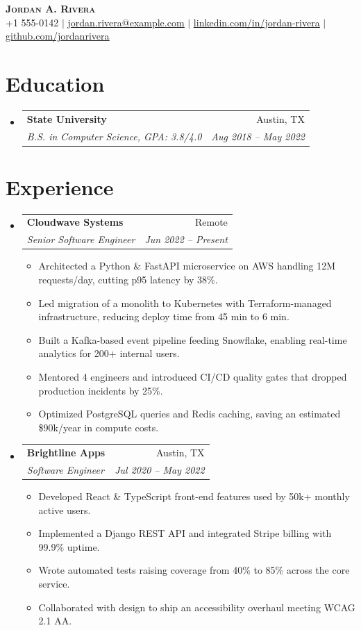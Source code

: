 \documentclass[letterpaper,11pt]{article}
\makeatletter
\newcommand{\resumeItem}[1]{
  \item\small{{#1 \vspace{-2pt}}}
}
\newcommand{\resumeSubheading}[4]{
  \vspace{-2pt}\item
    \begin{tabular*}{0.97\textwidth}[t]{l@{\extracolsep{\fill}}r}
      \textbf{#1} & #2 \\
      \textit{\small#3} & \textit{\small #4} \\
    \end{tabular*}\vspace{-7pt}
}
\newcommand{\resumeSubHeadingListStart}{\begin{itemize}[leftmargin=0.15in, label={}]}
\newcommand{\resumeSubHeadingListEnd}{\end{itemize}}
\newcommand{\resumeItemListStart}{\begin{itemize}}
\newcommand{\resumeItemListEnd}{\end{itemize}\vspace{-5pt}}
\makeatother
\begin{document}
\begin{center}
    \textbf{\Huge \scshape Jordan A. Rivera} \\ \vspace{1pt}
    \small +1 555-0142 $|$
    \href{mailto:jordan.rivera@example.com}{\underline{jordan.rivera@example.com}} $|$
    \href{https://linkedin.com/in/jordan-rivera}{\underline{linkedin.com/in/jordan-rivera}} $|$
    \href{https://github.com/jordanrivera}{\underline{github.com/jordanrivera}}
\end{center}

\section{Education}
  \resumeSubHeadingListStart
    \resumeSubheading
      {State University}{Austin, TX}
      {B.S. in Computer Science, GPA: 3.8/4.0}{Aug 2018 -- May 2022}
  \resumeSubHeadingListEnd

\section{Experience}
  \resumeSubHeadingListStart
    \resumeSubheading
      {Cloudwave Systems}{Remote}
      {Senior Software Engineer}{Jun 2022 -- Present}
      \resumeItemListStart
        \resumeItem{Architected a Python \& FastAPI microservice on AWS handling 12M requests/day, cutting p95 latency by 38\%.}
        \resumeItem{Led migration of a monolith to Kubernetes with Terraform-managed infrastructure, reducing deploy time from 45 min to 6 min.}
        \resumeItem{Built a Kafka-based event pipeline feeding Snowflake, enabling real-time analytics for 200+ internal users.}
        \resumeItem{Mentored 4 engineers and introduced CI/CD quality gates that dropped production incidents by 25\%.}
        \resumeItem{Optimized PostgreSQL queries and Redis caching, saving an estimated \$90k/year in compute costs.}
      \resumeItemListEnd
    \resumeSubheading
      {Brightline Apps}{Austin, TX}
      {Software Engineer}{Jul 2020 -- May 2022}
      \resumeItemListStart
        \resumeItem{Developed React \& TypeScript front-end features used by 50k+ monthly active users.}
        \resumeItem{Implemented a Django REST API and integrated Stripe billing with 99.9\% uptime.}
        \resumeItem{Wrote automated tests raising coverage from 40\% to 85\% across the core service.}
        \resumeItem{Collaborated with design to ship an accessibility overhaul meeting WCAG 2.1 AA.}
      \resumeItemListEnd
  \resumeSubHeadingListEnd
\end{document}
